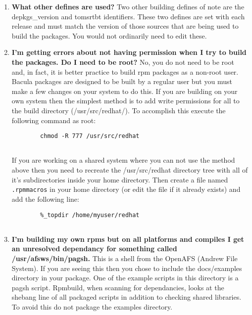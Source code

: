 \begin{enumerate}
\begin{verbatim}
\end{verbatim}
\normalsize

in the spec file directly or pass it to rpmbuild on the command line:  

\footnotesize
\begin{verbatim}
        rpmbuild -ba --define "build_rh7 1" --define "build_mysql 1" bacula.spec
        
\end{verbatim}
\normalsize

\item 
   \label{faq3}
   {\bf What other defines are used?}
Two other building defines of note are the depkgs\_version and tomsrtbt
identifiers. These  two defines are set with each release and must match the
version of those sources that are  being used to build the packages. You would
not ordinarily need to edit these.  
\item 
   \label{faq4}
   {\bf I'm getting errors about not having permission when I try  to build the
packages. Do I need to be root?}
No, you do not need to be root and, in fact, it is better practice to build
rpm packages  as a non-root user. Bacula packages are designed to be built by
a regular user but you must  make a few changes on your system to do this. If
you are building on your own system then  the simplest method is to add write
permissions for all to the build directory  (/usr/src/redhat/). To accomplish
this execute the following command as root:  

\footnotesize
\begin{verbatim}
        chmod -R 777 /usr/src/redhat
        
\end{verbatim}
\normalsize

If you are working on a shared system where you can not use the method above
then you need to  recreate the /usr/src/redhat directory tree with all of it's
subdirectories inside your home  directory. Then create a file named  {\tt
.rpmmacros} in your home directory (or edit  the file if it already exists)
and add the following line:  

\footnotesize
\begin{verbatim}
        %_topdir /home/myuser/redhat
        
\end{verbatim}
\normalsize

\item 
   \label{faq5}
   {\bf I'm building my own rpms but on all platforms and compiles  I get an
unresolved dependancy for something called /usr/afsws/bin/pagsh.}
This is a shell from the OpenAFS (Andrew File System). If you are seeing this
then you  chose to include the docs/examples directory in your package. One of
the example scripts  in this directory is a pagsh script. Rpmbuild, when
scanning for dependancies, looks at  the shebang line of all packaged scripts
in addition to checking shared libraries. To avoid  this do not package the
examples directory.  
\end{enumerate}
